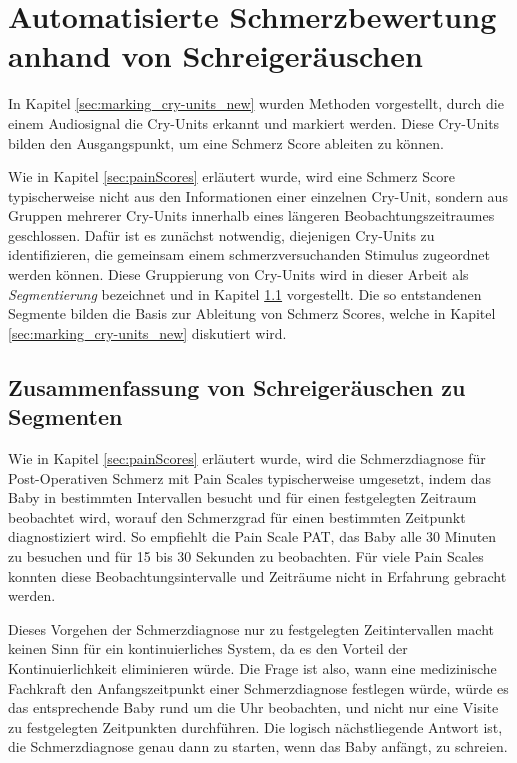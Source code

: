 \chapter{Automatisierte Schmerzbewertung anhand von Schreigeräuschen}
\label{sec:deduction}

In Kapitel \ref{sec:marking_cry-units_new} wurden Methoden vorgestellt, durch die einem Audiosignal die Cry-Units erkannt und markiert werden. Diese Cry-Units bilden den Ausgangspunkt, um eine Schmerz Score ableiten zu können. 

Wie in Kapitel \ref{sec:painScores} erläutert wurde, wird eine Schmerz Score typischerweise nicht aus den Informationen einer einzelnen Cry-Unit, sondern aus Gruppen mehrerer Cry-Units innerhalb eines längeren Beobachtungszeitraumes geschlossen. Dafür ist es zunächst notwendig, diejenigen Cry-Units zu identifizieren, die gemeinsam einem schmerzversuchanden Stimulus zugeordnet werden können. Diese Gruppierung von Cry-Units wird in dieser Arbeit als \emph{Segmentierung} bezeichnet und in Kapitel \ref{sec:segmenting} vorgestellt. Die so entstandenen Segmente bilden die Basis zur Ableitung von Schmerz Scores, welche in Kapitel \ref{sec:marking_cry-units_new} diskutiert wird.


\section{Zusammenfassung von Schreigeräuschen zu Segmenten}
\label{sec:segmenting}

Wie in Kapitel \ref{sec:painScores} erläutert wurde, wird die Schmerzdiagnose für Post-Operativen Schmerz mit Pain Scales typischerweise umgesetzt, indem das Baby in bestimmten Intervallen besucht und für einen festgelegten Zeitraum beobachtet wird, worauf den Schmerzgrad für einen bestimmten Zeitpunkt diagnostiziert wird. So empfiehlt die Pain Scale PAT, das Baby alle 30 Minuten zu besuchen und für 15 bis 30 Sekunden zu beobachten. Für viele Pain Scales konnten diese  Beobachtungsintervalle und Zeiträume nicht in Erfahrung gebracht werden. 

Dieses Vorgehen der Schmerzdiagnose nur zu festgelegten Zeitintervallen macht keinen Sinn für ein kontinuierliches System, da es den Vorteil der Kontinuierlichkeit eliminieren würde. Die Frage ist also, wann eine medizinische Fachkraft den Anfangszeitpunkt einer Schmerzdiagnose festlegen würde, würde es das entsprechende Baby rund um die Uhr beobachten, und nicht nur eine Visite zu festgelegten Zeitpunkten durchführen. Die logisch nächstliegende Antwort ist, die Schmerzdiagnose genau dann zu starten, wenn das Baby anfängt, zu schreien. 

